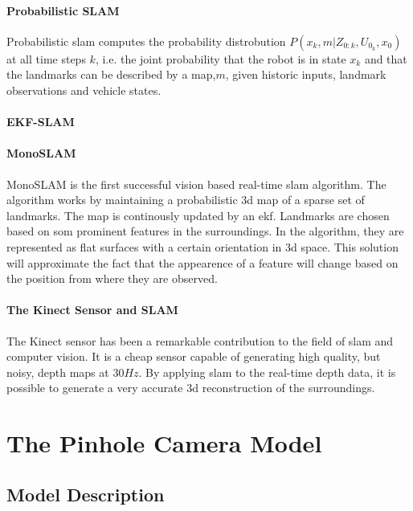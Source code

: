 \paragraph{Probabilistic SLAM}
Probabilistic \gls{slam} computes the probability distrobution $P(x_k,m|Z_{0:k},U_{0_k},x_0)$ at all time steps $k$\cite{SLAMp1}, i.e. the joint probability that the robot is in state \boldmath$x_k$ and that the landmarks can be described by a map,\boldmath$m$, given historic inputs, landmark observations and vehicle states.

\paragraph{EKF-SLAM}

\paragraph{MonoSLAM}

MonoSLAM is the first successful vision based real-time \gls{slam} algorithm\cite{monoSLAM}. The algorithm works by maintaining a probabilistic 3d map of a sparse set of landmarks. The map is continously updated by an \gls{ekf}. Landmarks are chosen based on som prominent features in the surroundings. In the algorithm, they are represented as flat surfaces with a certain orientation in 3d space. This solution will approximate the fact that the appearence of a feature will change based on the position from where they are observed.

\paragraph{The Kinect Sensor and SLAM}

The Kinect sensor has been a remarkable contribution to the field of \gls{slam} and computer vision. It is a cheap sensor capable of generating high quality, but noisy, depth maps at $30 Hz$. By applying \gls{slam} to the real-time depth data, it is possible to generate a very accurate 3d reconstruction of the surroundings.


\section{The Pinhole Camera Model}

\subsection{Model Description}

